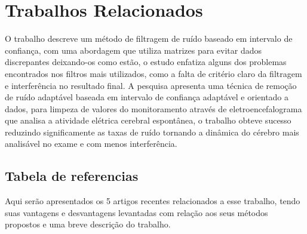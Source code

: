 \section{Trabalhos Relacionados}%

O trabalho \cite{kalambet2011noise} descreve um método de filtragem de ruído baseado em intervalo de confiança, com uma abordagem que utiliza matrizes para evitar dados discrepantes deixando-os como estão, o estudo enfatiza alguns dos problemas encontrados nos filtros mais utilizados, como a falta de critério claro da filtragem e interferência no resultado final. A pesquisa \cite{madhale2020adaptive} apresenta uma técnica de remoção de ruído adaptável baseada em intervalo de confiança adaptável e orientado a dados, para limpeza de valores do monitoramento através de eletroencefalograma que analisa a atividade elétrica cerebral espontânea, o trabalho obteve sucesso reduzindo significamente as taxas de ruído tornando a dinâmica do cérebro mais analisável no exame e com menos interferência.

\subsection{Tabela de referencias}
Aqui serão apresentados os 5 artigos recentes relacionados a esse trabalho, tendo suas vantagens e desvantagens levantadas com relação aos seus métodos propostos e uma breve descrição do trabalho.

